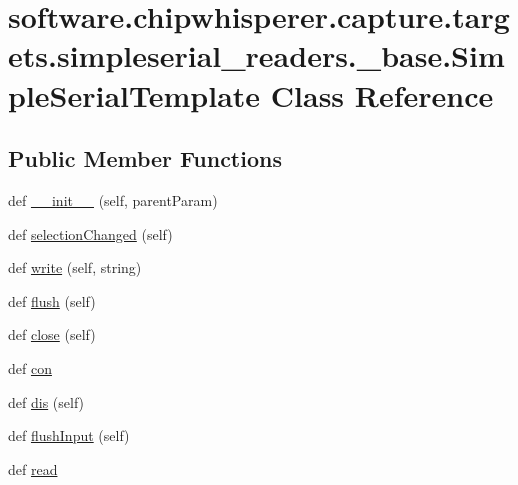 \hypertarget{classsoftware_1_1chipwhisperer_1_1capture_1_1targets_1_1simpleserial__readers_1_1__base_1_1SimpleSerialTemplate}{}\section{software.\+chipwhisperer.\+capture.\+targets.\+simpleserial\+\_\+readers.\+\_\+base.\+Simple\+Serial\+Template Class Reference}
\label{classsoftware_1_1chipwhisperer_1_1capture_1_1targets_1_1simpleserial__readers_1_1__base_1_1SimpleSerialTemplate}
\subsection*{Public Member Functions}
\begin{DoxyCompactItemize}
\item 
def \hyperlink{classsoftware_1_1chipwhisperer_1_1capture_1_1targets_1_1simpleserial__readers_1_1__base_1_1SimpleSerialTemplate_a5b19bb41bbdd31c2c3b52d4a4aab9b35}{\+\_\+\+\_\+init\+\_\+\+\_\+} (self, parent\+Param)
\item 
def \hyperlink{classsoftware_1_1chipwhisperer_1_1capture_1_1targets_1_1simpleserial__readers_1_1__base_1_1SimpleSerialTemplate_a37ada6dacc38acc0e4c09ee2118012f4}{selection\+Changed} (self)
\item 
def \hyperlink{classsoftware_1_1chipwhisperer_1_1capture_1_1targets_1_1simpleserial__readers_1_1__base_1_1SimpleSerialTemplate_adabf382161deaf538a2381ae5636847b}{write} (self, string)
\item 
def \hyperlink{classsoftware_1_1chipwhisperer_1_1capture_1_1targets_1_1simpleserial__readers_1_1__base_1_1SimpleSerialTemplate_ac4e68a39778e29ec289795916d2c593b}{flush} (self)
\item 
def \hyperlink{classsoftware_1_1chipwhisperer_1_1capture_1_1targets_1_1simpleserial__readers_1_1__base_1_1SimpleSerialTemplate_aff89065eaf46612731cb5c0ea83ceb14}{close} (self)
\item 
def \hyperlink{classsoftware_1_1chipwhisperer_1_1capture_1_1targets_1_1simpleserial__readers_1_1__base_1_1SimpleSerialTemplate_af0766995910201e7470ec7e178c067d0}{con}
\item 
def \hyperlink{classsoftware_1_1chipwhisperer_1_1capture_1_1targets_1_1simpleserial__readers_1_1__base_1_1SimpleSerialTemplate_abb141b2805b4eea1042d4e71c288e4c0}{dis} (self)
\item 
def \hyperlink{classsoftware_1_1chipwhisperer_1_1capture_1_1targets_1_1simpleserial__readers_1_1__base_1_1SimpleSerialTemplate_a67f94d4d8de663d4b78071f1060d7aca}{flush\+Input} (self)
\item 
def \hyperlink{classsoftware_1_1chipwhisperer_1_1capture_1_1targets_1_1simpleserial__readers_1_1__base_1_1SimpleSerialTemplate_a10ce93eebc0291449ed309314c12034d}{read}
\end{DoxyCompactItemize}
